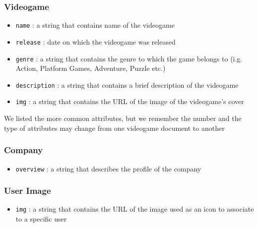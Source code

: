 \subsubsection{Videogame}
\begin{itemize}
    \item \texttt{name} : a string that contains name of the videogame 
    \item \texttt{release} : date on which the videogame was released
    \item \texttt{genre} : a string that contains the genre to which the game belongs to (i.g. Action, Platform Games, Adventure, Puzzle etc.)
    \item \texttt{description} : a string that contains a brief description of the videogame
    \item \texttt{img} : a string that contains the URL of the image of the videogame's cover
\end{itemize}
We listed the more common attributes, but we remember the number and the type of attributes may change from one videogame document to another 
\subsubsection{Company}
\begin{itemize}
    \item \texttt{overview} : a string that describes the profile of the company
\end{itemize}
\subsubsection{User Image}
\begin{itemize}
    \item \texttt{img} : a string that contains the URL of the image used as an icon to associate to a specific user 
\end{itemize}


